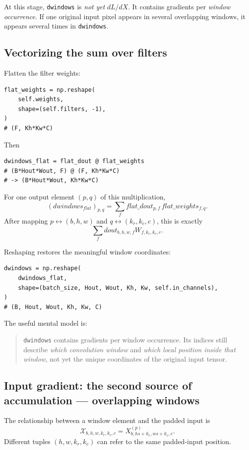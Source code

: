 \documentclass[11pt,a4paper]{article}
\newcommand{\code}[1]{\texttt{#1}}
\begin{document}
At this stage, \code{dwindows} is \emph{not yet} $dL/dX$. It contains gradients per \emph{window occurrence}. If one original input pixel appears in several overlapping windows, it appears several times in \code{dwindows}.

\subsection{Vectorizing the sum over filters}

Flatten the filter weights:
\begin{lstlisting}
flat_weights = np.reshape(
    self.weights,
    shape=(self.filters, -1),
)
# (F, Kh*Kw*C)
\end{lstlisting}

Then
\begin{lstlisting}
dwindows_flat = flat_dout @ flat_weights
# (B*Hout*Wout, F) @ (F, Kh*Kw*C)
# -> (B*Hout*Wout, Kh*Kw*C)
\end{lstlisting}

For one output element $(p,q)$ of this multiplication,
\[
(dwindows_{flat})_{p,q}
=
\sum_f flat\_dout_{p,f}\,flat\_weights_{f,q}.
\]
After mapping $p\leftrightarrow(b,h,w)$ and $q\leftrightarrow(k_r,k_c,c)$, this is exactly
\[
\sum_f dout_{b,h,w,f}W_{f,k_r,k_c,c}.
\]

Reshaping restores the meaningful window coordinates:
\begin{lstlisting}
dwindows = np.reshape(
    dwindows_flat,
    shape=(batch_size, Hout, Wout, Kh, Kw, self.in_channels),
)
# (B, Hout, Wout, Kh, Kw, C)
\end{lstlisting}

The useful mental model is:
\begin{quote}
\code{dwindows} contains gradients per window occurrence. Its indices still describe \emph{which convolution window} and \emph{which local position inside that window}, not yet the unique coordinates of the original input tensor.
\end{quote}

\subsection{Input gradient: the second source of accumulation --- overlapping windows}

The relationship between a window element and the padded input is
\[
\boxed{
\mathcal{X}_{b,h,w,k_r,k_c,c}
=
X^{(p)}_{b,hs+k_r,ws+k_c,c}
}.
\]
Different tuples $(h,w,k_r,k_c)$ can refer to the same padded-input position.
\end{document}
